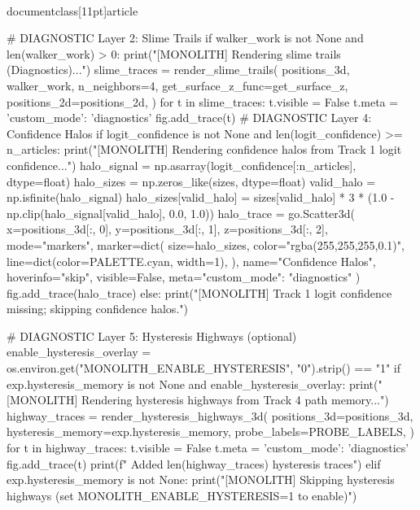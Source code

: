 \\documentclass[11pt]{article}
\begin{document}
\begin{CodeBlock}
{{{{{{        # DIAGNOSTIC Layer 2: Slime Trails
        if walker_work is not None and len(walker_work) > 0:
            print("[MONOLITH] Rendering slime trails (Diagnostics)...")
            slime_traces = render_slime_trails(
                positions_3d, walker_work, n_neighbors=4,
                get_surface_z_func=get_surface_z,
                positions_2d=positions_2d,
            )
            for t in slime_traces:
                t.visible = False
                t.meta = {'custom_mode': 'diagnostics'}
                fig.add_trace(t)
        # DIAGNOSTIC Layer 4: Confidence Halos
        if logit_confidence is not None and len(logit_confidence) >= n_articles:
            print("[MONOLITH] Rendering confidence halos from Track 1 logit confidence...")
            halo_signal = np.asarray(logit_confidence[:n_articles], dtype=float)
            halo_sizes = np.zeros_like(sizes, dtype=float)
            valid_halo = np.isfinite(halo_signal)
            halo_sizes[valid_halo] = sizes[valid_halo] * 3 * (1.0 - np.clip(halo_signal[valid_halo], 0.0, 1.0))
            halo_trace = go.Scatter3d(
                x=positions_3d[:, 0],
                y=positions_3d[:, 1],
                z=positions_3d[:, 2],
                mode="markers",
                marker=dict(
                    size=halo_sizes,
                    color="rgba(255,255,255,0.1)",
                    line=dict(color=PALETTE.cyan, width=1),
                ),
                name="Confidence Halos",
                hoverinfo="skip",
                visible=False,
                meta={"custom_mode": "diagnostics"}
            )
            fig.add_trace(halo_trace)
        else:
            print("[MONOLITH] Track 1 logit confidence missing; skipping confidence halos.")

        # DIAGNOSTIC Layer 5: Hysteresis Highways (optional)
        enable_hysteresis_overlay = os.environ.get("MONOLITH_ENABLE_HYSTERESIS", "0").strip() == "1"
        if exp.hysteresis_memory is not None and enable_hysteresis_overlay:
            print("[MONOLITH] Rendering hysteresis highways from Track 4 path memory...")
            highway_traces = render_hysteresis_highways_3d(
                positions_3d=positions_3d,
                hysteresis_memory=exp.hysteresis_memory,
                probe_labels=PROBE_LABELS,
            )
            for t in highway_traces:
                t.visible = False
                t.meta = {'custom_mode': 'diagnostics'}
                fig.add_trace(t)
            print(f"  Added {len(highway_traces)} hysteresis traces")
        elif exp.hysteresis_memory is not None:
            print("[MONOLITH] Skipping hysteresis highways (set MONOLITH_ENABLE_HYSTERESIS=1 to enable)")

}}}}}}
\end{CodeBlock}
\end{document}
